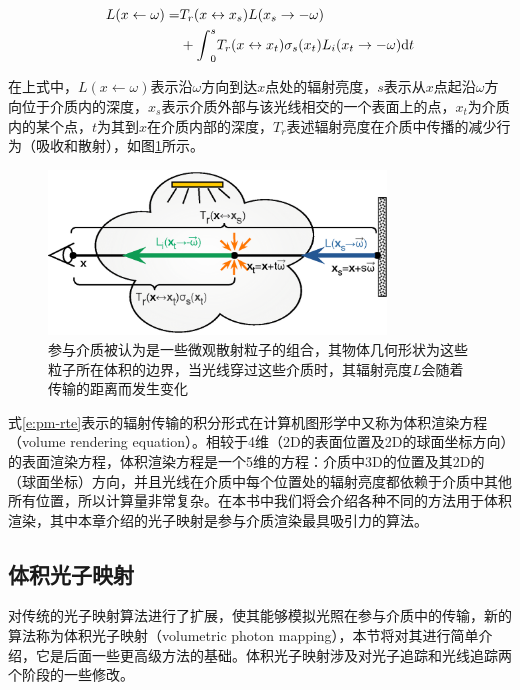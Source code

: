 \begin{equation}\label{e:pm-rte}
\begin{aligned}
	L(x\leftarrow{\omega})=&T_r(x\leftrightarrow x_s)L(x_s\to -{\omega})\\ &+{\rm \int}^{s}_{0}T_r(x\leftrightarrow x_t)\sigma_s(x_t)L_i(x_t\to -{\omega}){\rm d}t
\end{aligned}
\end{equation}

在上式中，$L(x\leftarrow{\omega})$表示沿${\omega}$方向到达$x$点处的辐射亮度，$s$表示从$x$点起沿${\omega}$方向位于介质内的深度，$x_s$表示介质外部与该光线相交的一个表面上的点，$x_t$为介质内的某个点，$t$为其到$x$在介质内部的深度，$T_r$表述辐射亮度在介质中传播的减少行为（吸收和散射），如图\ref{f:pm-transmittance}所示。

\begin{figure}
\begin{center}
	\includegraphics[width=0.8\textwidth]{figures/pm/transmittance}
\end{center}
	\caption{参与介质被认为是一些微观散射粒子的组合，其物体几何形状为这些粒子所在体积的边界，当光线穿过这些介质时，其辐射亮度$L$会随着传输的距离而发生变化}
	\label{f:pm-transmittance}
\end{figure}

式\ref{e:pm-rte}表示的辐射传输的积分形式在计算机图形学中又称为体积渲染方程（volume rendering equation）。相较于4维（2D的表面位置及2D的球面坐标方向）的表面渲染方程，体积渲染方程是一个5维的方程：介质中3D的位置及其2D的（球面坐标）方向，并且光线在介质中每个位置处的辐射亮度都依赖于介质中其他所有位置，所以计算量非常复杂。在本书中我们将会介绍各种不同的方法用于体积渲染，其中本章介绍的光子映射是参与介质渲染最具吸引力的算法。





\subsection{体积光子映射}\label{sec:pm-volumetric-phptpn-mapping}
\cite{a:EfficientSimulationofLightTransportinSceneswithParticipatingMediausingPhotonMaps}对传统的光子映射算法进行了扩展，使其能够模拟光照在参与介质中的传输，新的算法称为体积光子映射（volumetric photon mapping），本节将对其进行简单介绍，它是后面一些更高级方法的基础。体积光子映射涉及对光子追踪和光线追踪两个阶段的一些修改。



